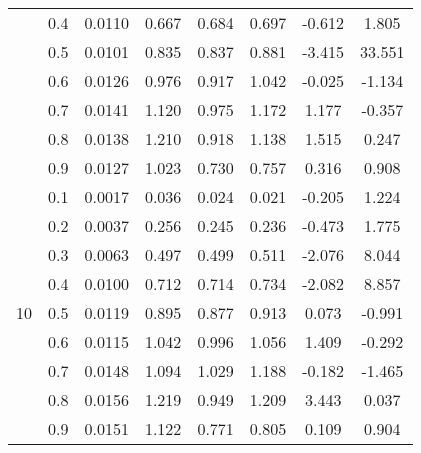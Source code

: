 \documentclass[11pt,a4paper]{report}
\begin{document}
\begin{longtable}{ | c | c || c | c | c | c | c | c | }
 & 0.4 & 0.0110 & 0.667 & 0.684 & 0.697 & -0.612 & 1.805 \\
 & 0.5 & 0.0101 & 0.835 & 0.837 & 0.881 & -3.415 & 33.551 \\
 & 0.6 & 0.0126 & 0.976 & 0.917 & 1.042 & -0.025 & -1.134 \\
 & 0.7 & 0.0141 & 1.120 & 0.975 & 1.172 & 1.177 & -0.357 \\
 & 0.8 & 0.0138 & 1.210 & 0.918 & 1.138 & 1.515 & 0.247 \\
 & 0.9 & 0.0127 & 1.023 & 0.730 & 0.757 & 0.316 & 0.908 \\
 \hline
\multirow{9}{*}{10} & 0.1 & 0.0017 & 0.036 & 0.024 & 0.021 & -0.205 & 1.224 \\
 & 0.2 & 0.0037 & 0.256 & 0.245 & 0.236 & -0.473 & 1.775 \\
 & 0.3 & 0.0063 & 0.497 & 0.499 & 0.511 & -2.076 & 8.044 \\
 & 0.4 & 0.0100 & 0.712 & 0.714 & 0.734 & -2.082 & 8.857 \\
 & 0.5 & 0.0119 & 0.895 & 0.877 & 0.913 & 0.073 & -0.991 \\
 & 0.6 & 0.0115 & 1.042 & 0.996 & 1.056 & 1.409 & -0.292 \\
 & 0.7 & 0.0148 & 1.094 & 1.029 & 1.188 & -0.182 & -1.465 \\
 & 0.8 & 0.0156 & 1.219 & 0.949 & 1.209 & 3.443 & 0.037 \\
 & 0.9 & 0.0151 & 1.122 & 0.771 & 0.805 & 0.109 & 0.904 \\
 \hline
\hline
\end{longtable}
\end{document}
